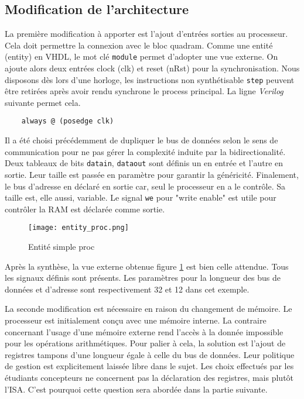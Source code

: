 \subsection{Modification de l'architecture}
La première modification à apporter est l'ajout d'entrées sorties au processeur.
Cela doit permettre la connexion avec le bloc quadram.
Comme une entité (entity) en VHDL, le mot clé \texttt{module} permet d'adopter une vue externe.
On ajoute alors deux entrées clock (clk) et reset (nRst) pour la synchronisation.
Nous disposons dès lors d'une horloge, les instructions non synthétisable \texttt{step} peuvent être retirées après avoir rendu synchrone le process principal. La ligne \textit{Verilog} suivante permet cela.
\begin{lstlisting}
    always @ (posedge clk)
\end{lstlisting}
Il a été choisi précédemment de dupliquer le bus de données selon le sens de communication pour ne pas gérer la complexité induite par la bidirectionalité. Deux tableaux de bits \texttt{datain}, \texttt{dataout} sont définis un en entrée et l'autre en sortie. Leur taille est passée en paramètre pour garantir la généricité. Finalement, le bus d'adresse en déclaré en sortie car, seul le processeur en a le contrôle. Sa taille est, elle aussi, variable.
Le signal \texttt{we} pour "write enable" est utile pour contrôler la \gls{RAM} est déclarée comme sortie.
\begin{figure}[H]
    \centering
    \texttt{[image: entity\_proc.png]}
    \caption{Entité simple proc}
    \label{entity_proc}
\end{figure}

Après la synthèse, la vue externe obtenue figure \ref{entity_proc} est bien celle attendue.
Tous les signaux définis sont présents. Les paramètres pour la longueur des bus de données et d'adresse sont respectivement 32 et 12 dans cet exemple. \\
\gap

La seconde modification est nécessaire en raison du changement de mémoire. 
Le processeur est initialement conçu avec une mémoire interne. 
La contraire concernant l'usage d'une mémoire externe rend l'accès à la donnée impossible pour les opérations arithmétiques.
Pour palier à cela, la solution est l'ajout de registres tampons d'une longueur égale à celle du bus de données.
Leur politique de gestion est explicitement laissée libre dans le sujet.
Les choix effectués par les étudiants concepteurs ne concernent pas la déclaration des registres, mais plutôt l'\gls{ISA}.
C'est pourquoi cette question sera abordée dans la partie suivante. \\
\gap

